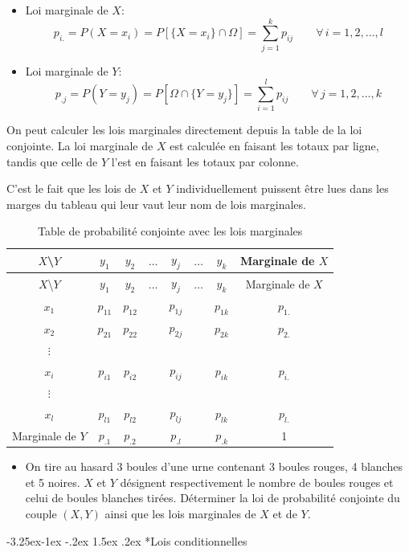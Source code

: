 \documentclass[]{book}
\makeatletter
\newenvironment{rmdblock}[1]
  {\begin{shaded*}
  \begin{itemize}
  \renewcommand{\labelitemi}{
    \raisebox{-.7\height}[0pt][0pt]{
      {\setkeys{Gin}{width=2em,keepaspectratio}\texttt{[image: img/icons/\#1]}}
    }
  }
  \item
  }
  {
  \end{itemize}
  \end{shaded*}
  }
\newenvironment{rmdexercise}
  {\begin{rmdblock}{exercise}}
  {\end{rmdblock}}
\renewcommand\subsection{\@startsection{subsection}{2}{\z@}%
                                     {-3.25ex\@plus -1ex \@minus -.2ex}%
                                     {1.5ex \@plus .2ex}%
                                     {\normalfont\large\bfseries\color{Violet}}}
\theoremstyle{magentacolor}
\theoremstyle{proprie}
\theoremstyle{exstyle}
\theoremstyle{exostyle}
\theoremstyle{definition}
\theoremstyle{definition}
\theoremstyle{definition}
\theoremstyle{remark}
\makeatother
\begin{document}
\begin{itemize}
\item
  Loi marginale de \(X\):
  \[p_{i.} = P(X=x_i) = P[\{X=x_i\}\cap \Omega] = \sum_{j=1}^k p_{ij} \quad \quad \forall \, i=1,2,\ldots,l\]
\item
  Loi marginale de \(Y\):
  \[p_{.j} = P(Y=y_j) = P[ \Omega \cap \{Y=y_j\}] = \sum_{i=1}^l p_{ij} \quad \quad \forall \, j=1,2,\ldots,k\]
\end{itemize}

On peut calculer les lois marginales directement depuis la table de la
loi conjointe. La loi marginale de \(X\) est
calculée en faisant les totaux par ligne, tandis que celle de \(Y\) l'est
en faisant les totaux par colonne.

C'est le fait que les lois de \(X\) et \(Y\) individuellement puissent être
lues dans les marges du tableau qui leur vaut leur nom de lois
marginales.

\begin{longtable}[]{@{}cccccccc@{}}
\caption{Table de probabilité conjointe avec les lois marginales}\tabularnewline
\toprule
\(X\)\textbackslash{}\(Y\) & \(y_1\) & \(y_2\) & \(\ldots\) & \(y_j\) & \(\ldots\) & \(y_k\) & Marginale de \(X\)\tabularnewline
\midrule
\endfirsthead
\toprule
\(X\)\textbackslash{}\(Y\) & \(y_1\) & \(y_2\) & \(\ldots\) & \(y_j\) & \(\ldots\) & \(y_k\) & Marginale de \(X\)\tabularnewline
\midrule
\endhead
\(x_1\) & \(p_{11}\) & \(p_{12}\) & & \(p_{1j}\) & & \(p_{1k}\) & \(p_{1.}\)\tabularnewline
\(x_2\) & \(p_{21}\) & \(p_{22}\) & & \(p_{2j}\) & & \(p_{2k}\) & \(p_{2.}\)\tabularnewline
\(\vdots\) & & & & & & &\tabularnewline
\(x_i\) & \(p_{i1}\) & \(p_{i2}\) & & \(p_{ij}\) & & \(p_{ik}\) & \(p_{i.}\)\tabularnewline
\(\vdots\) & & & & & & &\tabularnewline
\(x_l\) & \(p_{l1}\) & \(p_{l2}\) & & \(p_{lj}\) & & \(p_{lk}\) & \(p_{l.}\)\tabularnewline
Marginale de \(Y\) & \(p_{.1}\) & \(p_{.2}\) & & \(p_{.l}\) & & \(p_{.k}\) & 1\tabularnewline
\bottomrule
\end{longtable}

\begin{rmdexercise}
On tire au hasard 3 boules d'une urne contenant 3 boules rouges, 4
blanches et 5 noires. \(X\) et \(Y\) désignent respectivement le nombre
de boules rouges et celui de boules blanches tirées. Déterminer la loi
de probabilité conjointe du couple \((X,Y)\) ainsi que les lois
marginales de \(X\) et de \(Y\).
\end{rmdexercise}

\hypertarget{lois-conditionnelles}{%
\subsection*{Lois conditionnelles}\label{lois-conditionnelles}}
\end{document}
